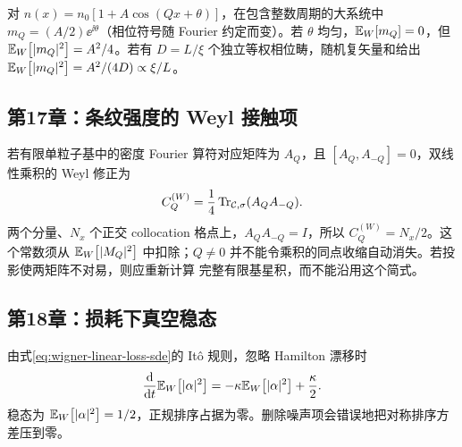 对
$n(x)=n_0[1+A\cos(Qx+\theta)]$，在包含整数周期的大系统中
$m_Q=(A/2)\ee^{\ii\theta}$（相位符号随 Fourier 约定而变）。若
$\theta$ 均匀，$\mathbb{E}_{W}\!\left[m_Q\right]=0$，但
$\mathbb{E}_{W}\!\left[|m_Q|^2\right]=A^2/4$。若有 $D=L/\xi$ 个独立等权相位畴，随机复矢量和给出
$\mathbb{E}_{W}\!\left[|m_Q|^2\right]=A^2/(4D)\propto\xi/L$。

\subsection*{第17章：条纹强度的 Weyl 接触项}

若有限单粒子基中的密度 Fourier 算符对应矩阵为 $A_Q$，且
$[A_Q,A_{-Q}]=0$，双线性乘积的 Weyl 修正为
\[
  C_Q^{(W)}=\frac14\operatorname{Tr}_{\mathcal C,\sigma}(A_QA_{-Q}).
\]
两个分量、$N_x$ 个正交 collocation 格点上，$A_QA_{-Q}=I$，所以
$C_Q^{(W)}=N_x/2$。这个常数须从 $\mathbb{E}_{W}\!\left[|M_Q|^2\right]$ 中扣除；$Q\ne0$
并不能令乘积的同点收缩自动消失。若投影使两矩阵不对易，则应重新计算
完整有限基星积，而不能沿用这个简式。

\subsection*{第18章：损耗下真空稳态}

由式\eqref{eq:wigner-linear-loss-sde}的 It\^o 规则，忽略 Hamilton 漂移时
\[
  \frac{\mathop{}\!\mathrm{d}}{\mathop{}\!\mathrm{d} t}\mathbb{E}_{W}\!\left[|\alpha|^2\right]
  =-\kappa\mathbb{E}_{W}\!\left[|\alpha|^2\right]+\frac\kappa2.
\]
稳态为 $\mathbb{E}_{W}\!\left[|\alpha|^2\right]=1/2$，正规排序占据为零。删除噪声项会错误地把对称排序方差压到零。
